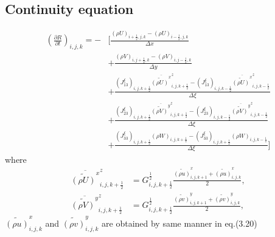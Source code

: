 \subsection{Continuity equation}
\begin{align}
 \left(\frac{\partial R}{\partial t}\right)_{i,j,k}
 = - &\Bigg[ \frac{ (\rho U)_{i+\frac{1}{2},j,k}
                  - (\rho U)_{i-\frac{1}{2},j,k}
                  } {\Delta x} \nonumber \\
          &+ \frac{ (\rho V)_{i,j+\frac{1}{2},k}
                  - (\rho V)_{i,j-\frac{1}{2},k}
                  } {\Delta y} \nonumber \\
          &+ \frac{ (J^{\xi}_{13})_{i,j,k+\frac{1}{2}} \overline{\widetilde{(\rho U)}^x}^z_{i,j,k+\frac{1}{2}}
                  - (J^{\xi}_{13})_{i,j,k-\frac{1}{2}} \overline{\widetilde{(\rho U)}^x}^z_{i,j,k-\frac{1}{2}}
                  } {\Delta \xi} \nonumber \\
          &+ \frac{ (J^{\xi}_{23})_{i,j,k+\frac{1}{2}} \overline{\widetilde{(\rho V)}^y}^z_{i,j,k+\frac{1}{2}}
                  - (J^{\xi}_{23})_{i,j,k-\frac{1}{2}} \overline{\widetilde{(\rho V)}^y}^z_{i,j,k-\frac{1}{2}}
                  } {\Delta \xi} \nonumber \\
          &+ \frac{ (J^{\xi}_{33})_{i,j,k+\frac{1}{2}} (\rho W)_{i,j,k+\frac{1}{2}}
                  - (J^{\xi}_{33})_{i,j,k+\frac{1}{2}} (\rho W)_{i,j,k-\frac{1}{2}}
                  } {\Delta \xi} \Bigg]
\end{align}
where
\begin{align}
 \overline{\widetilde{(\rho U)}^x}^z_{i,j,k+\frac{1}{2}}
 &= G^{\frac{1}{2}}_{i,j,k+\frac{1}{2}} \frac{ \widetilde{(\rho u)}^x_{i,j,k+1}
                                             + \widetilde{(\rho u)}^x_{i,j,k  }
                                             } {2}, \\
 \overline{\widetilde{(\rho V)}^y}^z_{i,j,k+\frac{1}{2}}
 &= G^{\frac{1}{2}}_{i,j,k+\frac{1}{2}} \frac{ \widetilde{(\rho v)}^y_{i,j,k+1}
                                             + \widetilde{(\rho v)}^y_{i,j,k  }
                                             } {2},
\end{align}
$\widetilde{(\rho u)}^x_{i,j,k}$ and $\widetilde{(\rho v)}^y_{i,j,k}$ are obtained by same manner in eq.(3.20)

